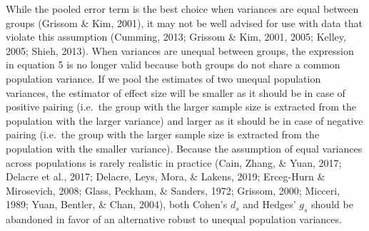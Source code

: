 \documentclass[
  english,
  man,floatsintext]{apa6}
\begin{document}
While the pooled error term is the best choice when variances are equal between groups (Grissom \& Kim, 2001), it may not be well advised for use with data that violate this assumption (Cumming, 2013; Grissom \& Kim, 2001, 2005; Kelley, 2005; Shieh, 2013). When variances are unequal between groups, the expression in equation 5 is no longer valid because both groups do not share a common population variance. If we pool the estimates of two unequal population variances, the estimator of effect size will be smaller as it should be in case of positive pairing (i.e.~the group with the larger sample size is extracted from the population with the larger variance) and larger as it should be in case of negative pairing (i.e.~the group with the larger sample size is extracted from the population with the smaller variance). Because the assumption of equal variances across populations is rarely realistic in practice (Cain, Zhang, \& Yuan, 2017; Delacre et al., 2017; Delacre, Leys, Mora, \& Lakens, 2019; Erceg-Hurn \& Mirosevich, 2008; Glass, Peckham, \& Sanders, 1972; Grissom, 2000; Micceri, 1989; Yuan, Bentler, \& Chan, 2004), both Cohen's \(d_s\) and Hedges' \(g_s\) should be abandoned in favor of an alternative robust to unequal population variances.
\end{document}
